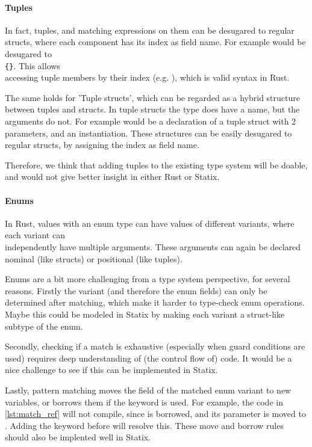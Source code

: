 \paragraph{Tuples}

In fact, tuples, and matching expressions on them can be desugared to regular structs, where each component has its index as field name. For example  would be desugared to\\ \texttt{\{}\texttt{\}}. This allows\\ accessing tuple members by their index (e.g. ), which is valid syntax in Rust.

The same holds for 'Tuple structs', which can be regarded as a hybrid structure between tuples and structs. In tuple structs the type does have a name, but the arguments do not. For example  would be a declaration of a tuple struct with 2  parameters, and  an instantiation. These structures can be easily desugared to regular structs, by assigning the index as field name.

Therefore, we think that adding tuples to the existing type system will be doable, and would not give better insight in either Rust or Statix.

\paragraph{Enums}

In Rust, values with an enum type can have values of different variants, where each variant can \\independently have multiple arguments. These arguments can again be declared nominal (like structs) or positional (like tuples). 

Enums are a bit more challenging from a type system perspective, for several reasons. Firstly the variant (and therefore the enum fields) can only be determined after matching, which make it harder to type-check enum operations. Maybe this could be modeled in Statix by making each variant a struct-like subtype of the enum.

Secondly, checking if a match is exhaustive (especially when guard conditions are used) requires deep understanding of (the control flow of) code. It would be a nice challenge to see if this can be implemented in Statix.

Lastly, pattern matching moves the field of the matched enum variant to new variables, or borrows them if the  keyword is used. For example, the code in \autoref{lst:match_ref} will not compile, since  is borrowed, and its parameter is moved to . Adding the  keyword before  will resolve this. These move and borrow rules should also be implented well in Statix.

